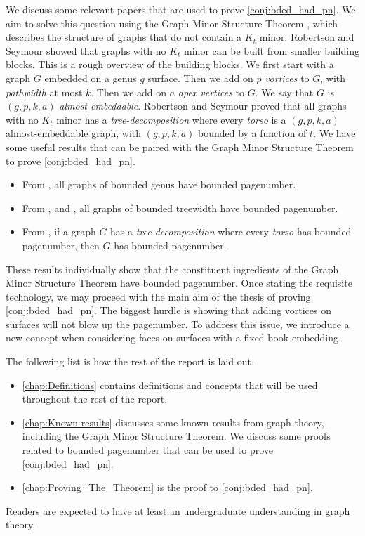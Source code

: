 We discuss some relevant papers that are used to prove \cref{conj:bded_had_pn}.
We aim to solve this question using the Graph Minor Structure Theorem \cite{robertsonGraphMinorsXVI2003}, which describes the structure of graphs that do not contain a \(K_t\) minor.
Robertson and Seymour showed that graphs with no \(K_t\) minor can be built from smaller building blocks. This is a rough overview of the building blocks. We first start with a graph \(G\) embedded on a genus \(g\) surface. Then we add on \(p\) \textit{vortices} to \(G\), with \textit{pathwidth} at most \(k\). Then we add on \(a\) \textit{apex vertices} to \(G\). We say that \(G\) is \((g, p, k, a)\)-\textit{almost embeddable}. Robertson and Seymour \cite{robertsonGraphMinorsXVI2003} proved that all graphs with no \(K_t\) minor has a \textit{tree-decomposition} where every \textit{torso} is a \((g, p, k, a)\) almost-embeddable graph, with \((g, p, k, a)\) bounded by a function of \(t\).
We have some useful results that can be paired with the Graph Minor Structure Theorem to prove \cref{conj:bded_had_pn}.
\begin{itemize}
	\item From \textcite{heathPagenumberGenusGraphs1992}, all graphs of bounded genus have bounded pagenumber.
	\item From \textcite{ganleyPagenumberTrees2001}, and \textcite{dujmovicGraphTreewidthGeometric2007}, all graphs of bounded treewidth have bounded pagenumber.
	\item From \textcite{hickingbothamStackNumberCliqueSum2023}, if a graph \(G\) has a \textit{tree-decomposition} where every \textit{torso} has bounded pagenumber, then \(G\) has bounded pagenumber.
\end{itemize}
These results individually show that the constituent ingredients of the Graph Minor Structure Theorem have bounded pagenumber. Once stating the requisite technology, we may proceed with the main aim of the thesis of proving \cref{conj:bded_had_pn}. 
The biggest hurdle is showing that adding vortices on surfaces will not blow up the pagenumber. To address this issue, we introduce a new concept when considering faces on surfaces with a fixed book-embedding. 

The following list is how the rest of the report is laid out. 
\begin{itemize}
	\item \cref{chap:Definitions} contains definitions and concepts that will be used throughout the rest of the report.
	\item \cref{chap:Known results} discusses some known results from graph theory, including the Graph Minor Structure Theorem. We discuss some proofs related to bounded pagenumber that can be used to prove \cref{conj:bded_had_pn}.

	\item \cref{chap:Proving_The_Theorem} is the proof to \cref{conj:bded_had_pn}. 
\end{itemize}
Readers are expected to have at least an undergraduate understanding in graph theory.
